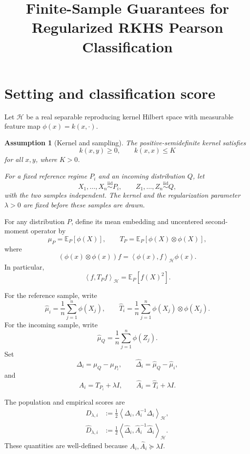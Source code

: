 \documentclass[11pt]{article}
\title{Finite-Sample Guarantees for Regularized RKHS
Pearson Classification}
\author{}
\date{}
\newcommand{\HH}{\mathcal H}
\newcommand{\E}{\mathbb E}
\newcommand{\inner}[2]{\left\langle #1,#2\right\rangle_{\HH}}
\newtheorem{assumption}{Assumption}
\begin{document}
\maketitle

\section{Setting and classification score}

Let $\HH$ be a real separable reproducing kernel Hilbert
space with measurable feature map $\phi(x)=k(x,\cdot)$.

\begin{assumption}[Kernel and sampling]
\label{ass:setting}
The positive-semidefinite kernel satisfies
\[
    k(x,y)\ge 0,
    \qquad
    k(x,x)\le K
\]
for all $x,y$, where $K>0$.

For a fixed reference regime $P_i$ and an incoming
distribution $Q$, let
\[
    X_1,\ldots,X_n \overset{\mathrm{iid}}{\sim} P_i,
    \qquad
    Z_1,\ldots,Z_n \overset{\mathrm{iid}}{\sim} Q,
\]
with the two samples independent.
The kernel and the regularization parameter $\lambda>0$
are fixed before these samples are drawn.
\end{assumption}

For any distribution $P$, define its mean embedding and
uncentered second-moment operator by
\[
    \mu_P=\E_P[\phi(X)],
    \qquad
    T_P=\E_P[\phi(X)\otimes\phi(X)],
\]
where
\[
    (\phi(x)\otimes\phi(x))f
    =\inner{\phi(x)}{f}\phi(x).
\]
In particular,
\[
    \inner{f}{T_Pf}=\E_P[f(X)^2].
\]

For the reference sample, write
\[
    \widehat\mu_i=\frac1n\sum_{j=1}^n\phi(X_j),
    \qquad
    \widehat T_i
    =\frac1n\sum_{j=1}^n\phi(X_j)\otimes\phi(X_j).
\]
For the incoming sample, write
\[
    \widehat\mu_Q=\frac1n\sum_{j=1}^n\phi(Z_j).
\]
Set
\[
    \Delta_i=\mu_Q-\mu_{P_i},
    \qquad
    \widehat\Delta_i=\widehat\mu_Q-\widehat\mu_i,
\]
and
\[
    A_i=T_{P_i}+\lambda I,
    \qquad
    \widehat A_i=\widehat T_i+\lambda I.
\]

The population and empirical scores are
\begin{align}
    D_{\lambda,i}
    &:=\frac12\inner{\Delta_i}{A_i^{-1}\Delta_i},
    \label{eq:population-score}\\
    \widehat D_{\lambda,i}
    &:=\frac12
       \inner{\widehat\Delta_i}
             {\widehat A_i^{-1}\widehat\Delta_i}.
    \label{eq:empirical-score}
\end{align}
These quantities are well-defined because
$A_i,\widehat A_i\succeq\lambda I$.
\end{document}
